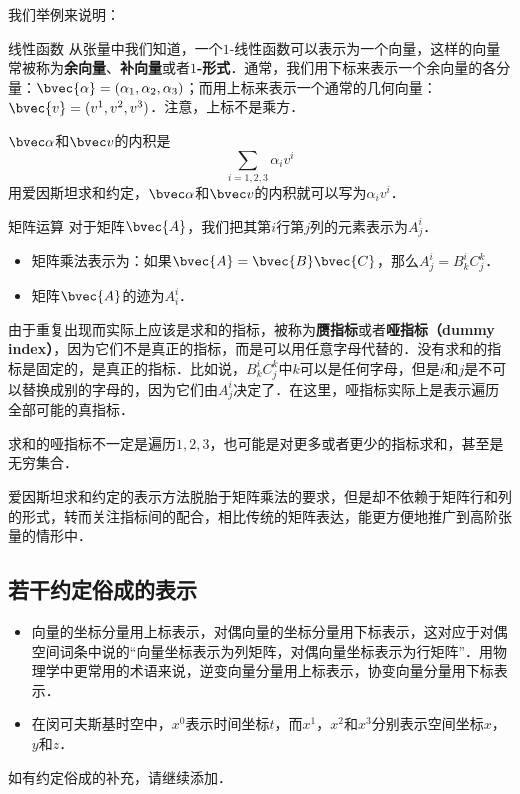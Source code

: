 我们举例来说明：

\begin{example}{线性函数}
从张量中我们知道，一个$1$-线性函数可以表示为一个向量，这样的向量常被称为\textbf{余向量}、\textbf{补向量}或者\textbf{$1$-形式}．通常，我们用下标来表示一个余向量的各分量：$\bvec{\alpha}=(\alpha_1, \alpha_2, \alpha_3)$；而用上标来表示一个通常的几何向量：$\bvec{v}=(v^1, v^2, v^3)$．注意，上标不是乘方．

$\bvec\alpha$和$\bvec v$的内积是$$\sum\limits_{i=1, 2, 3}\alpha_i v^i$$
用爱因斯坦求和约定，$\bvec\alpha$和$\bvec v$的内积就可以写为$\alpha_i v^i$．
\end{example}

\begin{example}{矩阵运算}
对于矩阵$\bvec{A}$，我们把其第$i$行第$j$列的元素表示为$A^i_j$．
\begin{itemize}
\item 矩阵乘法表示为：如果$\bvec{A}=\bvec{B}\bvec{C}$，那么$A^i_j=B^i_k C^k_j$．
\item 矩阵$\bvec{A}$的迹为$A^i_i$．

\end{itemize}
\end{example}

由于重复出现而实际上应该是求和的指标，被称为\textbf{赝指标}或者\textbf{哑指标（dummy index）}，因为它们不是真正的指标，而是可以用任意字母代替的．没有求和的指标是固定的，是真正的指标．比如说，$B^i_k C^k_j$中$k$可以是任何字母，但是$i$和$j$是不可以替换成别的字母的，因为它们由$A^i_j$决定了．在这里，哑指标实际上是表示遍历全部可能的真指标．

求和的哑指标不一定是遍历$1, 2, 3$，也可能是对更多或者更少的指标求和，甚至是无穷集合．

爱因斯坦求和约定的表示方法脱胎于矩阵乘法的要求，但是却不依赖于矩阵行和列的形式，转而关注指标间的配合，相比传统的矩阵表达，能更方便地推广到高阶张量的情形中．


\subsection{若干约定俗成的表示}
\begin{itemize}
\item 向量的坐标分量用上标表示，对偶向量的坐标分量用下标表示，这对应于对偶空间词条中说的“向量坐标表示为列矩阵，对偶向量坐标表示为行矩阵”．用物理学中更常用的术语来说，逆变向量分量用上标表示，协变向量分量用下标表示．

\item 在闵可夫斯基时空中，$x^0$表示时间坐标$t$，而$x^1$，$x^2$和$x^3$分别表示空间坐标$x$，$y$和$z$．



\end{itemize}
\begin{issues}
如有约定俗成的补充，请继续添加．
\end{issues}


